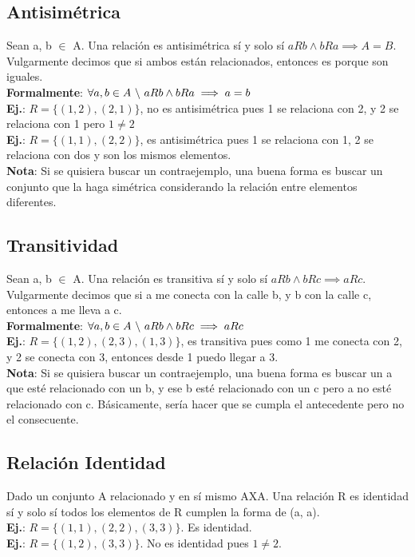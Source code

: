 \documentclass[10pt,a4paper]{article}
\begin{document}
\subsection*{Antisimétrica}
Sean a, b $\in$ A. Una relación es antisimétrica sí y solo sí $aRb \land bRa \implies A = B$. Vulgarmente decimos que si ambos están relacionados, entonces es porque son iguales. \\
\textbf{Formalmente}: $ \forall a, b \in A \ \symbol{92} \ aRb \land bRa \implies a=b$ \\
\textbf{Ej.}: $R = \{(1, 2), (2, 1)\}$, no es antisimétrica pues 1 se relaciona con 2, y 2 se relaciona con 1 pero $1 \neq 2$ \\
\textbf{Ej.}: $R = \{(1, 1), (2, 2)\}$, es antisimétrica pues 1 se relaciona con 1, 2 se relaciona con dos y son los mismos elementos. \\

\textbf{Nota}: Si se quisiera buscar un contraejemplo, una buena forma es buscar un conjunto que la haga simétrica considerando la relación entre elementos diferentes.
\subsection*{Transitividad}
Sean a, b $\in$ A. Una relación es transitiva sí y solo sí $aRb \land bRc \implies aRc$. Vulgarmente decimos que si a me conecta con la calle b, y b con la calle c, entonces a me lleva a c. \\
\textbf{Formalmente}: $ \forall a, b \in A \ \symbol{92} \ aRb \land bRc \implies aRc$ \\
\textbf{Ej.}: $R = \{(1, 2), (2, 3), (1, 3) \}$, es transitiva pues como 1 me conecta con 2, y 2 se conecta con 3, entonces desde 1 puedo llegar a 3. \\
\textbf{Nota}: Si se quisiera buscar un contraejemplo, una buena forma es buscar un a que esté relacionado con un b, y ese b esté relacionado con un c pero a no esté relacionado con c. Básicamente, sería hacer que se cumpla el antecedente pero no el consecuente.
\subsection*{Relación Identidad}
Dado un conjunto A relacionado y en sí mismo AXA. Una relación R es identidad sí y solo sí todos los elementos de R cumplen la forma de (a, a). \\
\textbf{Ej.}: $R = \{(1, 1), (2, 2), (3, 3)\}$. Es identidad. \\
\textbf{Ej.}: $R = \{(1, 2), (3, 3) \}$. No es identidad pues $1 \neq 2$.
\end{document}
